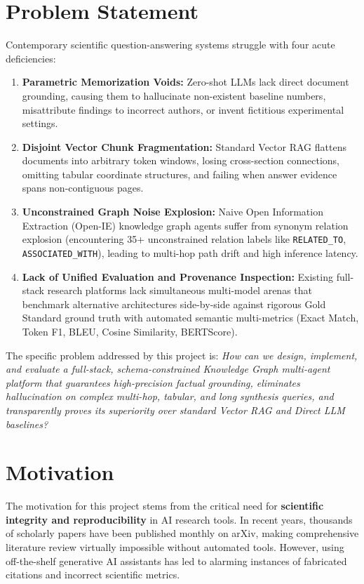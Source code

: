\documentclass[12pt,a4paper,oneside]{report}
\begin{document}
\section{Problem Statement}
Contemporary scientific question-answering systems struggle with four acute deficiencies:
\begin{enumerate}
    \item \textbf{Parametric Memorization Voids:} Zero-shot LLMs lack direct document grounding, causing them to hallucinate non-existent baseline numbers, misattribute findings to incorrect authors, or invent fictitious experimental settings.
    \item \textbf{Disjoint Vector Chunk Fragmentation:} Standard Vector RAG flattens documents into arbitrary token windows, losing cross-section connections, omitting tabular coordinate structures, and failing when answer evidence spans non-contiguous pages.
    \item \textbf{Unconstrained Graph Noise Explosion:} Naive Open Information Extraction (Open-IE) knowledge graph agents suffer from synonym relation explosion (encountering 35+ unconstrained relation labels like \texttt{RELATED\_TO}, \texttt{ASSOCIATED\_WITH}), leading to multi-hop path drift and high inference latency.
    \item \textbf{Lack of Unified Evaluation and Provenance Inspection:} Existing full-stack research platforms lack simultaneous multi-model arenas that benchmark alternative architectures side-by-side against rigorous Gold Standard ground truth with automated semantic multi-metrics (Exact Match, Token F1, BLEU, Cosine Similarity, BERTScore).
\end{enumerate}

The specific problem addressed by this project is: \textit{How can we design, implement, and evaluate a full-stack, schema-constrained Knowledge Graph multi-agent platform that guarantees high-precision factual grounding, eliminates hallucination on complex multi-hop, tabular, and long synthesis queries, and transparently proves its superiority over standard Vector RAG and Direct LLM baselines?}

\section{Motivation}
The motivation for this project stems from the critical need for \textbf{scientific integrity and reproducibility} in AI research tools. In recent years, thousands of scholarly papers have been published monthly on arXiv, making comprehensive literature review virtually impossible without automated tools. However, using off-the-shelf generative AI assistants has led to alarming instances of fabricated citations and incorrect scientific metrics. 
\end{document}
